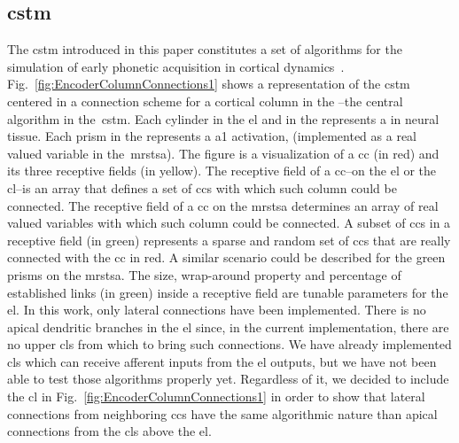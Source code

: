 {%
}{
\subsection{\gls{cstm}}

The \gls{cstm} introduced in this paper constitutes a set of algorithms for the simulation of early phonetic acquisition in cortical dynamics~\cite{10.1371/journal.pone.0217966}. Fig.~\ref{fig:EncoderColumnConnections1} shows a representation of the \gls{cstm} centered in a connection scheme for a cortical column in the --the central algorithm in the~\gls{cstm}. Each cylinder in the \gls{el} and in the  represents a  in neural tissue. Each prism in the  represents a \gls{a1} activation, (implemented as a real valued variable in the~\gls{mrstsa}). The figure is a visualization of a \gls{cc} (in red) and its three receptive fields (in yellow). The receptive field of a \gls{cc}--on the \gls{el} or the \gls{cl}--is an array that defines a set of \glspl{cc} with which such column could be connected. The receptive field of a \gls{cc} on the \gls{mrstsa} determines an array of real valued variables with which such column could be connected. A subset of \glspl{cc} in a receptive field (in green) represents a sparse and random set of \glspl{cc} that are really connected with the \gls{cc} in red. A similar scenario could be described for the green prisms on the \gls{mrstsa}. The size, wrap-around property and percentage of established links (in green) inside a receptive field are tunable parameters for the \gls{el}. In this work, only lateral connections have been implemented. There is no apical dendritic branches in the \gls{el} since, in the current implementation, there are no upper \glspl{cl} from which to bring such connections. We have already implemented \glspl{cl} which can receive afferent inputs from the \gls{el} outputs, but we have not been able to test those algorithms properly yet. Regardless of it, we decided to include the \gls{cl} in Fig.~\ref{fig:EncoderColumnConnections1} in order to show that lateral connections from neighboring \glspl{cc} have the same algorithmic nature than apical connections from the \glspl{cl} above the \gls{el}.

}
